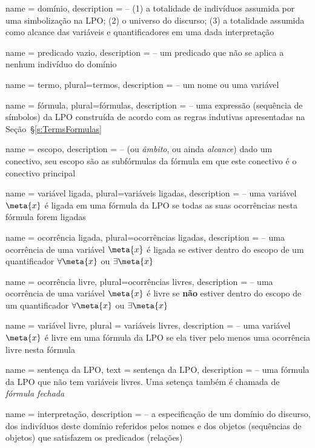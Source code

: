 {
 name = domínio,
 description = {-- (1) a totalidade de indivíduos assumida por uma simbolização na LPO; (2) o universo do discurso; (3) a totalidade assumida como alcance das variáveis e quantificadores em uma dada interpretação}
}

{
 name = {predicado vazio},
 description = {-- um predicado que não se aplica a nenhum indivíduo do domínio}
}

{
 name = termo,
 plural=termos,
 description = {-- um nome ou uma variável}
}

{
 name = fórmula,
 plural=fórmulas,
 description = {-- uma expressão (sequência de símbolos) da LPO construída de acordo com as regras indutivas apresentadas na Seção~\S\ref{s:TermsFormulas}}
}

{
 name = escopo,
 description = {-- (ou \textit{âmbito}, ou ainda \textit{alcance}) dado um conectivo, seu escopo são as subfórmulas da fórmula em que este conectivo é o conectivo principal}
}

{
 name = variável ligada,
 plural=variáveis ligadas,
 description = {-- uma variável $\meta{x}$ é ligada em uma fórmula da LPO se todas as suas ocorrências nesta fórmula forem ligadas}
}

{
 name = ocorrência ligada,
 plural=ocorrências ligadas,
 description = {-- uma ocorrência de uma variável $\meta{x}$ é ligada se estiver dentro do escopo de um quantificador $\forall{\meta{x}}$ ou $\exists{\meta{x}}$}
}

{
 name = ocorrência livre,
 plural=ocorrências livres,
 description = {-- uma ocorrência de uma variável $\meta{x}$ é livre se \textbf{não} estiver dentro do escopo de um quantificador $\forall{\meta{x}}$ ou $\exists{\meta{x}}$}
}

{
 name = variável livre,
 plural = variáveis livres,
 description = {-- uma variável $\meta{x}$ é livre em uma fórmula da LPO se ela tiver pelo menos uma ocorrência livre nesta fórmula}
}

{
 name = sentença da LPO,
 text = sentença da LPO,
 description = {-- uma fórmula da LPO que não tem variáveis livres. Uma setença também é chamada de \textit{fórmula fechada}}
}

{
 name = {interpretação},
 description = {-- a especificação de um domínio do discurso, dos indivíduos deste domínio referidos pelos nomes e dos objetos (sequências de objetos) que satisfazem os predicados (relações)}
}

